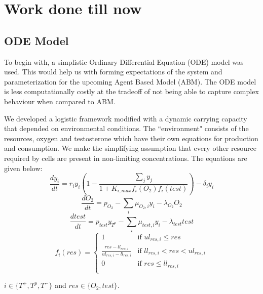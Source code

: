 \documentclass[a4paper]{article}
\begin{document}
\section{Work done till now}
\subsection{ODE Model}
To begin with, a simplistic Ordinary Differential Equation (ODE) model was used. This would help us with forming expectations of the system and parameterization for the upcoming Agent Based Model (ABM). The ODE model is less computationally costly at the tradeoff of not being able to capture complex behaviour when compared to ABM.

We developed a logistic framework modified with a dynamic carrying capacity that depended on environmental conditions. The ``environment" consists of the resources, oxygen and testosterone which have their own equations for production and consumption. We make the simplifying assumption that every other resource required by cells are present in non-limiting concentrations. The equations are given below:
\begin{equation}
  \frac{dy_i}{dt} = r_i y_i (1 - \frac{\sum_j y_j}{1 + K_{i,max} f_i(O_2) f_i(test)} )- \delta_i y_i
  \label{celleq}
\end{equation}
\begin{equation}
  \frac{dO_2}{dt} = p_{O_2} - \sum_i \mu_{O_2,i} y_i - \lambda_{O_2} O_2
  \label{o2eq}
\end{equation}
\begin{equation}
  \frac{dtest}{dt} = p_{test} y_{T^p} - \sum_i \mu_{test,i} y_i - \lambda_{test} test
  \label{testeq}
\end{equation}
\begin{equation}
  f_i(res) = \begin{cases}
    1 &\text{if } ul_{res,i} \leq res\\
    \frac{res-ll_{res,i}}{ul_{res,i}-ll_{res,i}} &\text{if } ll_{res,i} < res < ul_{res,i}\\
    0 &\text{if } res \leq ll_{res,i}\\
  \end{cases}
  \label{freseq}
\end{equation}

$i \in \{T^+,T^p,T^-\}$ and $res \in \{O_2,test\}$.
\end{document}
